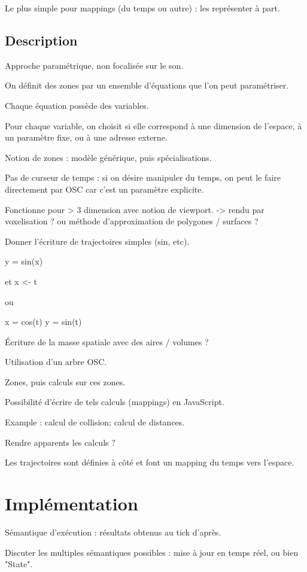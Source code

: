 \documentclass[french]{article}
\begin{document}
Le plus simple pour mappings (du temps ou autre) : les représenter à part.

\subsection{Description}
Approche paramétrique, non focalisée sur le son.

On définit des zones par un ensemble d'équations que l'on peut paramétriser.

Chaque équation possède des variables.

Pour chaque variable, on choisit si elle correspond à une dimension de l'espace, à un paramètre fixe, ou à une adresse externe.

Notion de zones : modèle générique, puis spécialisations.

Pas de curseur de temps : si on désire manipuler du temps, on peut le faire directement par OSC car c'est un paramètre explicite.

Fonctionne pour > 3 dimension avec notion de viewport.
-> rendu par voxelisation ? ou méthode d'approximation de polygones / surfaces ? 

Donner l'écriture de trajectoires simples (sin, etc).

y = sin(x)

et x <- t

ou

x = cos(t)
y = sin(t)

Écriture de la masse spatiale avec des aires / volumes ?

Utilisation d'un arbre OSC.

Zones, puis calculs sur ces zones. 

Possibilité d'écrire de tels calculs (mappings) en JavaScript.

Example : calcul de collision; calcul de distances.

Rendre apparents les calculs ?

Les trajectoires sont définies à côté et font un mapping du temps vers l'espace.

\section{Implémentation}

Sémantique d'exécution : résultats obtenus au tick d'après.

Discuter les multiples sémantiques possibles : mise à jour en temps réel, ou bien "State".
\end{document}
